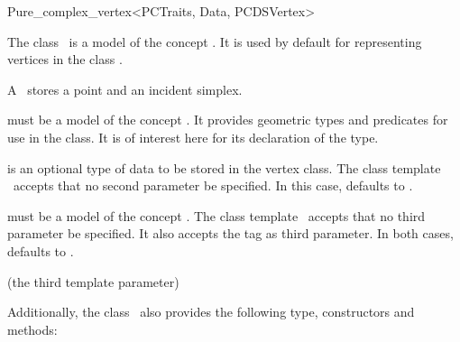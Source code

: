 \begin{ccRefClass}{Pure_complex_vertex<PCTraits, Data, PCDSVertex>}

\ccDefinition

The class \ccRefName\ is a model of the concept . It is
used by default for representing vertices in the class
.

A \ccRefName\ stores a point and an incident simplex.


\ccParameters

 must be a model of the concept . It
provides geometric types and predicates for use in the
 class. It is of interest here for its
declaration of the  type.

 is an optional type of data to be stored in the vertex class. The
class template \ccRefName\ accepts that no second parameter be specified. In
this case,  defaults to .

 must be a model of the concept . The
class template \ccRefName\ accepts that no third parameter be specified. It
also accepts the tag  as third parameter. In both cases,
 defaults to .

\ccInheritsFrom

 (the third template parameter)

\ccIsModel


Additionally, the class \ccRefName\ also provides the following type,
constructors and methods:

\ccTypes


\ccCreation
{}



\end{ccRefClass}
